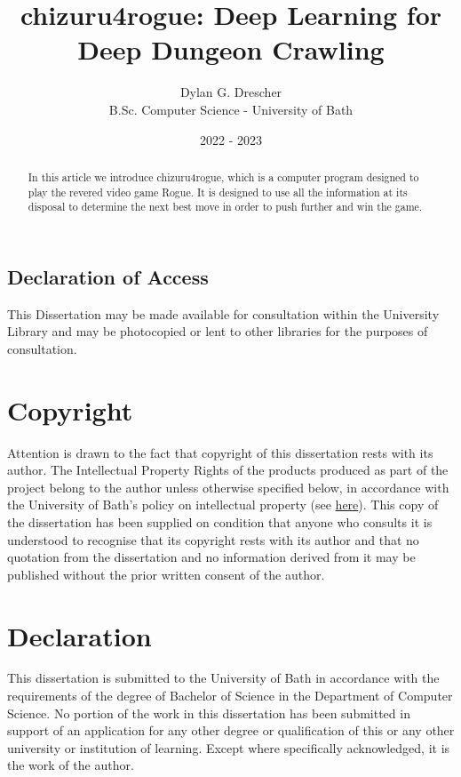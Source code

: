 \documentclass[11pt,a4paper]{article}
\begin{document}
\title{chizuru4rogue: Deep Learning for Deep Dungeon Crawling}
\author{Dylan G. Drescher \\[1ex] B.Sc. Computer Science - University of Bath}
\date{2022 - 2023}
\maketitle

\begin{abstract}
    In this article we introduce chizuru4rogue, which is a computer program designed to play the revered video game Rogue. It is designed to use all the information at its disposal to determine the next best move in order to push further and win the game.
\end{abstract}

\setcounter{page}{0}
\thispagestyle{empty}

\newpage
{}

\begin{center}
    \section*{Declaration of Access}

    This Dissertation may be made available for consultation within the University Library and may be photocopied or lent to other libraries for the purposes of consultation.
\end{center}

\newpage

\section*{Copyright}
Attention is drawn to the fact that copyright of this dissertation rests with its author. The Intellectual Property Rights of the products produced as part of the project belong to the author unless otherwise specified below, in accordance with the University of Bath's policy on intellectual property (see \href{https://www.bath.ac.uk/publications/university-ordinances/attachments/Ordinances_1_October_2020.pdf}{here}). This copy of the dissertation has been supplied on condition that anyone who consults it is understood to recognise that its copyright rests with its author and that no quotation from the dissertation and no information derived from it may be published without the prior written consent of the author.

\section*{Declaration}
This dissertation is submitted to the University of Bath in accordance with the requirements of the degree of Bachelor of Science in the Department of Computer Science. No portion of the work in this dissertation has been submitted in support of an application for any other degree or qualification of this or any other university or institution of learning. Except where specifically acknowledged, it is the work of the author.
\end{document}
